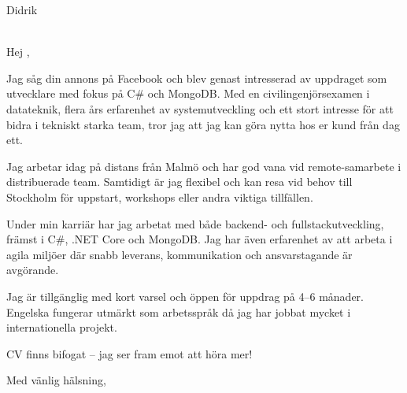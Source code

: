 \documentclass[a4paper,10pt]{letter}
\date{\today}
\begin{document}
\begin{letter}{Didrik  \\ \\ }

\opening{Hej ,}

Jag såg din annons på Facebook och blev genast intresserad av uppdraget som utvecklare med fokus på C\# och MongoDB. Med en civilingenjörsexamen i datateknik, flera års erfarenhet av systemutveckling och ett stort intresse för att bidra i tekniskt starka team, tror jag att jag kan göra nytta hos er kund från dag ett.

Jag arbetar idag på distans från Malmö och har god vana vid remote-samarbete i distribuerade team. Samtidigt är jag flexibel och kan resa vid behov till Stockholm för uppstart, workshops eller andra viktiga tillfällen.

Under min karriär har jag arbetat med både backend- och fullstackutveckling, främst i C\#, .NET Core och MongoDB. Jag har även erfarenhet av att arbeta i agila miljöer där snabb leverans, kommunikation och ansvarstagande är avgörande.

Jag är tillgänglig med kort varsel och öppen för uppdrag på 4–6 månader. Engelska fungerar utmärkt som arbetsspråk då jag har jobbat mycket i internationella projekt.

CV finns bifogat – jag ser fram emot att höra mer!

\closing{Med vänlig hälsning,}

\end{letter}
\end{document}
